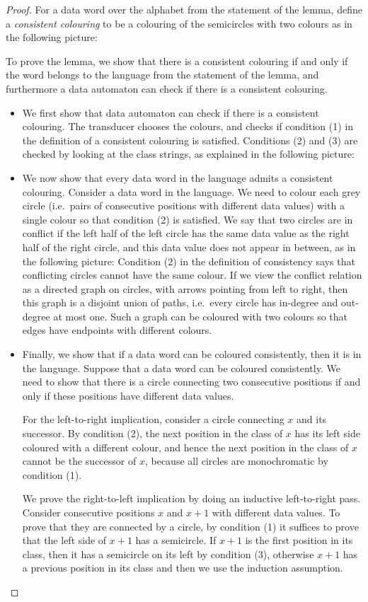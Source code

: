 \begin{proof} For a data word over the alphabet from the statement of the lemma, define a \emph{consistent colouring} to be a colouring of the semicircles with two colours as in the following picture:

To prove the lemma, we show that there is a consistent colouring if and only if the word belongs to the language from the statement of the lemma, and furthermore a data automaton can check if there is a consistent colouring. 
\begin{itemize} 
\item We first show that data automaton can check if there is a consistent colouring.
	The transducer chooses the colours, and checks if condition (1) in the definition of a consistent colouring is satisfied. Conditions (2) and (3) are checked by looking at the class strings, as explained in the following picture: 
\item We now show that every data word in the language admits a consistent colouring.
Consider a data word in the language. We need to colour each grey circle (i.e.~pairs of consecutive positions with different data values) with a single colour so that condition (2) is satisfied. We say that two circles are in conflict if the left half of the left circle has the same data value as the right half of the right circle, and this data value does not appear in between, as in the following picture: 
Condition (2) in the definition of consistency says that conflicting circles cannot have the same colour. If we view the conflict relation as a directed graph on circles, with arrows pointing from left to right, then this graph is a disjoint union of paths, i.e.~every circle has in-degree and out-degree at most one. Such a graph can be coloured with two colours so that edges have endpoints with different colours.
\item Finally, we show that if a data word can be coloured consistently, then it is in the language.
Suppose that a data word can be coloured consistently. We need to show that there is a circle connecting two consecutive positions if and only if these positions have different data values.

For the left-to-right implication, consider a circle connecting $x$ and its successor. By condition (2), the next position in the class of $x$ has its left side coloured with a different colour, and hence the next position in the class of $x$ cannot be the successor of $x$, because all circles are monochromatic by condition (1).

We prove the right-to-left implication by doing an inductive left-to-right pass. Consider consecutive positions $x$ and $x+1$ with different data values. To prove that they are connected by a circle, by condition (1) it suffices to prove that the left side of $x+1$ has a semicircle. If $x+1$ is the first position in its class, then it has a semicircle on its left by condition (3), otherwise $x+1$ has a previous position in its class and then we use the induction assumption.
\end{itemize}
\end{proof}

